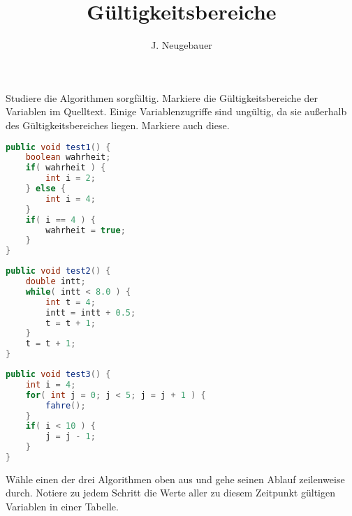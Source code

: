 \documentclass[10pt, a4paper]{scrartcl}
\author{J. Neugebauer}
\title{Gültigkeitsbereiche}
\date{\Heute}
\begin{document}
\ReiheTitel

\begin{aufgabe}
	Studiere die Algorithmen sorgfältig. Markiere die Gültigkeitsbereiche der Variablen im Quelltext. Einige Variablenzugriffe sind ungültig, da sie außerhalb des Gültigkeitsbereiches liegen. Markiere auch diese.
\end{aufgabe}

\begin{lstlisting}[language=java]
public void test1() {
    boolean wahrheit;
    if( wahrheit ) {
        int i = 2;
    } else {
        int i = 4;
    }
    if( i == 4 ) {
        wahrheit = true;
    }
}
\end{lstlisting}

\begin{lstlisting}[language=java]
public void test2() {
    double intt;
    while( intt < 8.0 ) {
        int t = 4;
        intt = intt + 0.5;
        t = t + 1;
    }
    t = t + 1;
}
\end{lstlisting}

\begin{lstlisting}[language=java]
public void test3() {
    int i = 4;
    for( int j = 0; j < 5; j = j + 1 ) {
        fahre();
    }
    if( i < 10 ) {
        j = j - 1;
    }
}
\end{lstlisting}

\begin{aufgabe}
	Wähle einen der drei Algorithmen oben aus und gehe seinen Ablauf zeilenweise durch. Notiere zu jedem Schritt die Werte aller zu diesem Zeitpunkt gültigen Variablen in einer Tabelle.
\end{aufgabe}
\end{document}
